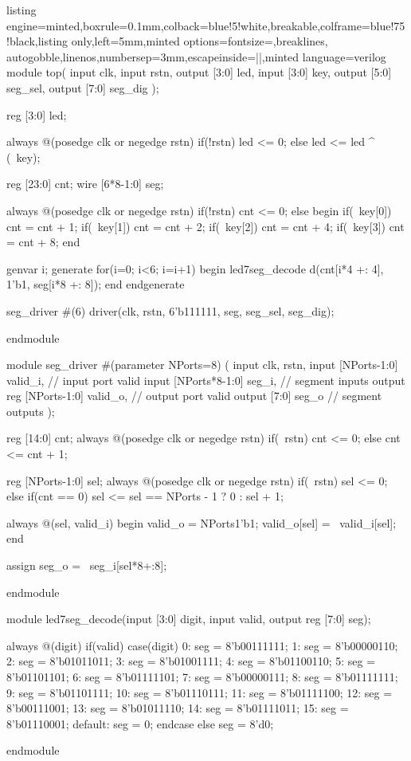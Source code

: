 \documentclass[a4paper]{article}
\begin{document}
\begin{tcblisting}{listing engine=minted,boxrule=0.1mm,colback=blue!5!white,breakable,colframe=blue!75!black,listing only,left=5mm,minted options={fontsize=\small,breaklines, autogobble,linenos,numbersep=3mm,escapeinside=||},minted language=verilog}
    module top(
    input clk,
    input rstn,
    output [3:0] led,
    input [3:0] key,
    output [5:0] seg_sel,
    output [7:0] seg_dig
);

    reg [3:0] led;

    always @(posedge clk or negedge rstn)
    if(!rstn)
        led <= 0;
    else
        led <= led ^ (~key);

    reg [23:0] cnt;
    wire [6*8-1:0] seg;

    always @(posedge clk or negedge rstn)
    if(!rstn)
        cnt <= 0;
    else begin
        if(~key[0]) cnt = cnt + 1;
        if(~key[1]) cnt = cnt + 2;
        if(~key[2]) cnt = cnt + 4;
        if(~key[3]) cnt = cnt + 8;
    end

    genvar i;
    generate for(i=0; i<6; i=i+1) begin
            led7seg_decode d(cnt[i*4 +: 4], 1'b1, seg[i*8 +: 8]);
        end
    endgenerate

    seg_driver #(6) driver(clk, rstn, 6'b111111, seg, seg_sel, seg_dig);

endmodule

module seg_driver #(parameter NPorts=8) (
    input clk, rstn,
    input [NPorts-1:0]   valid_i, // input port valid
    input [NPorts*8-1:0] seg_i, // segment inputs
    output reg [NPorts-1:0]  valid_o, // output port valid
    output [7:0]         seg_o // segment outputs
);

    reg [14:0] cnt;
    always @(posedge clk or negedge rstn)
    if(~rstn)
        cnt <= 0;
    else
        cnt <= cnt + 1;

    reg [NPorts-1:0] sel;
    always @(posedge clk or negedge rstn)
    if(~rstn)
        sel <= 0;
    else if(cnt == 0)
        sel <= sel == NPorts - 1 ? 0 : sel + 1;

    always @(sel, valid_i) begin
        valid_o = {NPorts{1'b1}};
        valid_o[sel] = ~valid_i[sel];
    end

    assign seg_o = ~seg_i[sel*8+:8];

endmodule

module led7seg_decode(input [3:0] digit, input valid, output reg [7:0] seg);

    always @(digit)
    if(valid)
        case(digit)
            0: seg = 8'b00111111;
            1: seg = 8'b00000110;
            2: seg = 8'b01011011;
            3: seg = 8'b01001111;
            4: seg = 8'b01100110;
            5: seg = 8'b01101101;
            6: seg = 8'b01111101;
            7: seg = 8'b00000111;
            8: seg = 8'b01111111;
            9: seg = 8'b01101111;
            10: seg = 8'b01110111;
            11: seg = 8'b01111100;
            12: seg = 8'b00111001;
            13: seg = 8'b01011110;
            14: seg = 8'b01111011;
            15: seg = 8'b01110001;
            default: seg = 0;
        endcase
    else seg = 8'd0;

endmodule
\end{tcblisting}

% 

% 
% 
\end{document}
